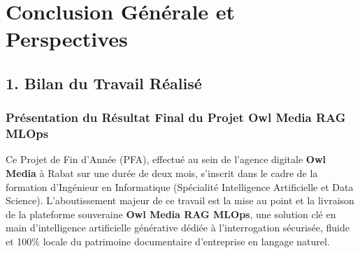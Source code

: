 \chapter*{Conclusion Générale et Perspectives}
\renewcommand{\labelitemi}{$\bullet$}

\section*{1. Bilan du Travail Réalisé}

\subsection*{Présentation du Résultat Final du Projet Owl Media RAG MLOps}
Ce Projet de Fin d'Année (PFA), effectué au sein de l'agence digitale \textbf{Owl Media} à Rabat sur une durée de deux mois, s'inscrit dans le cadre de la formation d'Ingénieur en Informatique (Spécialité Intelligence Artificielle et Data Science). L'aboutissement majeur de ce travail est la mise au point et la livraison de la plateforme souveraine \textbf{Owl Media RAG MLOps}, une solution clé en main d'intelligence artificielle générative dédiée à l'interrogation sécurisée, fluide et 100\% locale du patrimoine documentaire d'entreprise en langage naturel.

